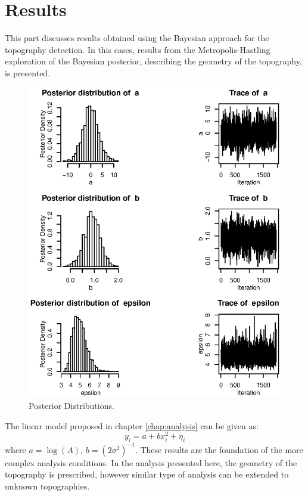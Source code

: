 \documentclass[12pt]{report}
\begin{document}
\newpage 




\chapter{Results}
This part discusses results obtained using the Bayesian approach for the topography detection. In this cases, results from the Metropolis-Hastling exploration of the Bayesian posterior, describing the geometry of the topography, is presented. 
\begin{figure}[!h]
 \label{fig:Posterior}
  \centering
      \includegraphics[scale=0.6]{PosteriorDistribution}
      \caption{Posterior Distributions.}
\end{figure}

The linear model proposed in chapter \ref{chap:analysis} can be given as:
\begin{equation}
y_i=a+bx_{i}^2+\eta_i
\end{equation}
where $a=\log(A)$, $b=(2\sigma^2)^{-1}$. These results are the foundation of the more complex analysis conditions. In the analysis presented here, the geometry of the topography is prescribed, however similar type of analysis can be extended to unknown topographies.
\end{document}
